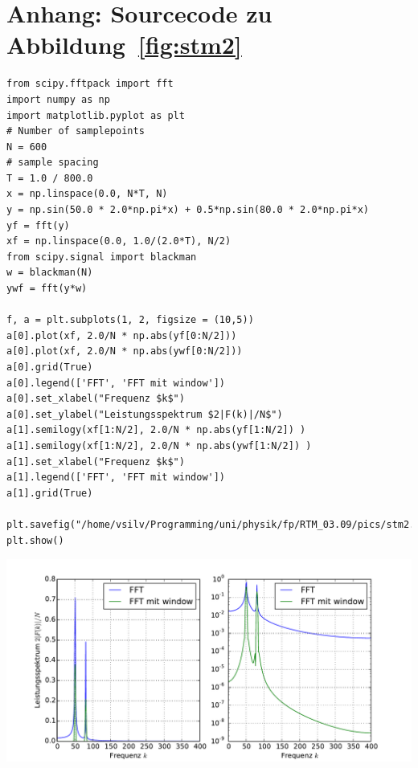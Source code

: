 \section{Anhang: Sourcecode zu Abbildung~\ref{fig:stm2}}
\begin{verbatim}
from scipy.fftpack import fft
import numpy as np
import matplotlib.pyplot as plt
# Number of samplepoints
N = 600
# sample spacing
T = 1.0 / 800.0
x = np.linspace(0.0, N*T, N)
y = np.sin(50.0 * 2.0*np.pi*x) + 0.5*np.sin(80.0 * 2.0*np.pi*x)
yf = fft(y)
xf = np.linspace(0.0, 1.0/(2.0*T), N/2)
from scipy.signal import blackman
w = blackman(N)
ywf = fft(y*w)

f, a = plt.subplots(1, 2, figsize = (10,5))
a[0].plot(xf, 2.0/N * np.abs(yf[0:N/2]))
a[0].plot(xf, 2.0/N * np.abs(ywf[0:N/2]))
a[0].grid(True)
a[0].legend(['FFT', 'FFT mit window'])
a[0].set_xlabel("Frequenz $k$")
a[0].set_ylabel("Leistungsspektrum $2|F(k)|/N$")
a[1].semilogy(xf[1:N/2], 2.0/N * np.abs(yf[1:N/2]) )
a[1].semilogy(xf[1:N/2], 2.0/N * np.abs(ywf[1:N/2]) )
a[1].set_xlabel("Frequenz $k$")
a[1].legend(['FFT', 'FFT mit window'])
a[1].grid(True)

plt.savefig("/home/vsilv/Programming/uni/physik/fp/RTM_03.09/pics/stm2.pdf")
plt.show()
\end{verbatim}
\includegraphics[width=17cm]{pics/stm2}

